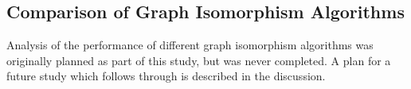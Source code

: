 \subsection{Comparison of Graph Isomorphism Algorithms}
Analysis of the performance of different graph isomorphism algorithms was originally planned as part of this study, but was never completed. A plan for a future study which follows through is described in the discussion. 